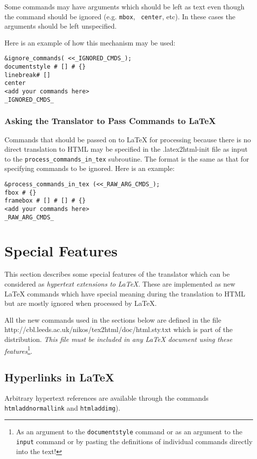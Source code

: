 Some commands may have arguments which should be left as
text even though the command should be ignored (e.g. {\tt mbox}, {\tt
center}, etc). In these cases the arguments should be left unspecified.

Here is an example of how this mechanism may be used:
\begin{verbatim}
&ignore_commands( <<_IGNORED_CMDS_);
documentstyle # [] # {}
linebreak# []
center
<add your commands here>
_IGNORED_CMDS_
\end{verbatim}
\subsubsection{Asking the Translator to Pass Commands to LaTeX}
\label{pass}
Commands that should be passed on to LaTeX for processing because
there is no direct translation to HTML may be specified in the {\fn
.latex2html-init}
file as input to the {\tt {\verb|process_commands_in_tex|}}
subroutine.
The format is the same as that for specifying commands to be ignored.
Here is an example:
\begin{verbatim}
&process_commands_in_tex (<<_RAW_ARG_CMDS_);
fbox # {}
framebox # [] # [] # {}
<add your commands here>
_RAW_ARG_CMDS_
\end{verbatim}
\section{Special Features}
\label{special} 
This section describes some special features of the translator which
can be considered as {\em hypertext extensions to \LaTeX}.
These are implemented as new LaTeX commands which have special 
meaning during the translation to HTML but are mostly ignored when
processed by \LaTeX.

All the new commands used in the sections 
below are defined in the file  
{http://cbl.leeds.ac.uk/nikos/tex2html/doc/html.sty.txt} which is part of the 
distribution. {\em This file must be included in any 
LaTeX document using these features}\footnote{As an argument to the 
{\tt documentstyle} command or as an argument to the {\tt input}
command or by pasting the definitions of individual commands
directly into the text!}.

\subsection{Hyperlinks in LaTeX}
\label{sec:hyper}   
Arbitrary hypertext references are available 
through the commands 
{\tt htmladdnormallink} and {\tt htmladdimg}).

